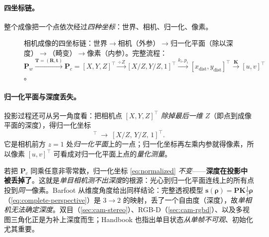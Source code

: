 \paragraph{四坐标链。}
整个成像把一个点依次经过\emph{四种坐标}\cite{gaoxiang2019slam14}：世界、相机、归一化、像素。

\begin{figure}[ht]
\centering
{}
\caption{相机成像的四坐标链：世界$\to$相机（外参）$\to$归一化平面（除以深度）$\to$（畸变）$\to$像素（内参）。完整流程：$\mathbf{P}_w\xrightarrow{\mathbf{T}=(\mathbf{R},\mathbf{t})}\mathbf{P}_c=[X,Y,Z]^\top\xrightarrow{\div Z}[X/Z,Y/Z,1]^\top\xrightarrow{k_i,p_i}[x_{\text{dist}},y_{\text{dist}}]^\top\xrightarrow{\mathbf{K}}[u,v]^\top$。}
\label{fig:coord-chain}
\end{figure}

\paragraph{归一化平面与深度丢失。}
投影过程还可从另一角度看\cite{gaoxiang2019slam14}：把相机点 $[X,Y,Z]^\top$ \emph{除掉最后一维 $Z$}（即点到成像平面的深度），得归一化坐标
\begin{equation}
  [X,Y,Z]^\top\ \longrightarrow\ [X/Z,\,Y/Z,\,1]^\top.
  \label{eq:normalized}
\end{equation}
它是相机前方 $z=1$ 处\emph{归一化平面}上的一点；归一化坐标再左乘内参就得像素，所以像素 $[u,v]^\top$ 可看成对归一化平面上点的\emph{量化测量}。

\begin{insight}[深度在投影中丢失 = 单目测不出深度]
若把 $\mathbf{P}_c$ 同乘任意非零常数，归一化坐标 \cref{eq:normalized} \emph{不变}——\textbf{深度在投影中被丢掉了}。这就是\emph{单目相机测不出深度}的根源：光心到归一化平面连线上的所有点投到\emph{同一}像素\cite{gaoxiang2019slam14}。Barfoot 从维度角度给出同样结论\cite{barfoot2024state}：完整透视模型 $\mathbf{s}(\boldsymbol\rho)=\mathbf{P}\mathbf{K}\tfrac1z\boldsymbol\rho$（\cref{eq:complete-perspective}）是 $3\to2$ 的映射，丢了一个自由度（深度），故\emph{单相机无法确定深度}。双目（\cref{sec:cam-stereo}）、RGB-D（\cref{sec:cam-rgbd}）、以及多视图三角化正是为补上深度而生；Handbook 也指出单目状态\emph{从单帧不可观}、初始化尤其重要\cite{carlone2026handbook}。
\end{insight}

